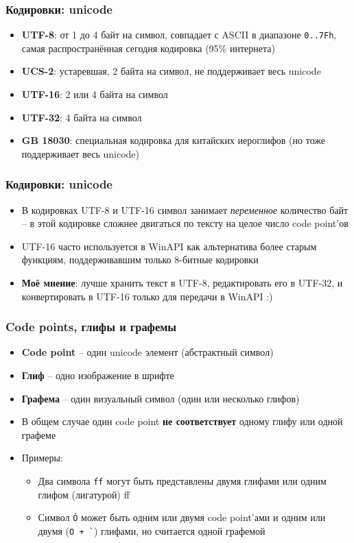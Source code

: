 \documentclass{beamer}
\begin{document}
\begin{frame}[fragile]
\frametitle{Кодировки: unicode}
\begin{itemize}
\item \textbf{UTF-8}: от 1 до 4 байт на символ, совпадает с ASCII в диапазоне \verb|0..7Fh|, самая распространённая сегодня кодировка (95\% интернета)
\pause
\item \textbf{UCS-2}: устаревшая, 2 байта на символ, не поддерживает весь unicode
\pause
\item \textbf{UTF-16}: 2 или 4 байта на символ
\pause
\item \textbf{UTF-32}: 4 байта на символ
\pause
\item \textbf{GB 18030}: специальная кодировка для китайских иероглифов (но тоже поддерживает весь unicode)
\end{itemize}
\end{frame}

\begin{frame}[fragile]
\frametitle{Кодировки: unicode}
\begin{itemize}
\item В кодировках UTF-8 и UTF-16 символ занимает \textit{переменное} количество байт -- в этой кодировке сложнее двигаться по тексту на целое число code point'ов
\pause
\item UTF-16 часто используется в WinAPI как альтернатива более старым функциям, поддерживавшим только 8-битные кодировки
\pause
\item \textbf{Моё мнение}: лучше хранить текст в UTF-8, редактировать его в UTF-32, и конвертировать в UTF-16 только для передачи в WinAPI :)
\end{itemize}
\end{frame}

\begin{frame}[fragile]
\frametitle{Code points, глифы и графемы}
\begin{itemize}
\item \textbf{Code point} -- один unicode элемент (абстрактный символ)
\pause
\item \textbf{Глиф} -- одно изображение в шрифте
\pause
\item \textbf{Графема} -- один визуальный символ (один или несколько глифов)
\pause
\item В общем случае один code point \alert{\textbf{не соответствует}} одному глифу или одной графеме
\pause
\item Примеры:
\begin{itemize}
\item Два символа \verb|ff| могут быть представлены двумя глифами или одним глифом (лигатурой) ff
\pause
\item Символ \verb|Ò| может быть одним или двумя code point'ами и одним или двумя (\verb|O + `|) глифами, но считается одной графемой
\end{itemize}
\end{itemize}
\end{frame}
\end{document}
